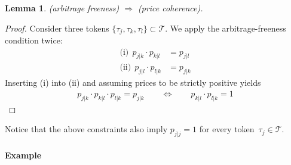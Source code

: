 \documentclass[11pt,parskip=full]{scrartcl}%
\newcommand*{\tokens}{\mathcal{T}}          %
\newtheorem{lemma}[theorem]{Lemma}
\begin{document}
\vspace{.8cm}
\begin{lemma}
  (arbitrage freeness) $ \Rightarrow $ (price coherence).
\end{lemma}
\vspace{-.8cm}
\begin{proof}
  Consider three tokens $ \{\tau_j,\tau_k,\tau_l\} \subset \tokens $.
  We apply the arbitrage-freeness condition twice:
  \begin{align*}
    \text{(i)}  \>\> p_{j|k} \cdot p_{k|l} &= p_{j|l} \\
    \text{(ii)} \>\> p_{j|l} \cdot p_{l|k} &= p_{j|k}
  \end{align*}
  Inserting (i) into (ii) and assuming prices to be strictly positive yields
  \begin{align*}
    p_{j|k} \cdot p_{k|l} \cdot p_{l|k} = p_{j|k}
    \qquad \Leftrightarrow \qquad
    p_{k|l} \cdot p_{l|k} = 1
  \end{align*}
\end{proof}
\vspace{-.4cm}

Notice that the above constraints also imply $ p_{j|j} = 1 $ for every
token~$ \tau_j \in \tokens $.

\begin{comment}
\paragraph{Properties}

Here is a list of research questions that we would like to answer.

\begin{itemize}
  \item In an optimal solution, is it guaranteed that orders can always be fully executed if their
  limit prices are strictly higher (buy order) or lower (sell order) than the exchange rate between
  the respective token pair?
  If true, we would only need to resort to partially executing orders if the execution price is
  equal to the limit price.
  \item What is the impact of optimizing the trading volume vs. the traders' welfare?
\end{itemize}
\end{comment}

\newpage
\paragraph{Example}
\end{document}
